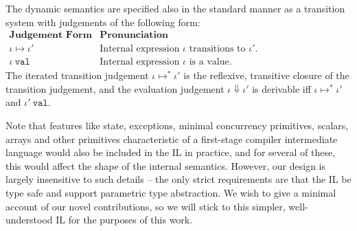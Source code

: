 \noindent
The dynamic semantics are specified also in the standard manner as a transition system with  judgements of the following form:
\\[1ex]
$
\begin{array}{ll}
\textbf{Judgement Form} & \textbf{Pronunciation}\\
\iota \mapsto \iota' & \text{Internal expression $\iota$ transitions to $\iota'$.}\\
\iota~\mathtt{val} & \text{Internal expression $\iota$ is a value.}
\end{array}
$
\\[1ex]
The iterated transition judgement $\iota \mapsto^{*} \iota'$ is the reflexive, transitive closure of the transition judgement, and the evaluation judgement $\iota \Downarrow \iota'$ is derivable iff $\iota \mapsto^{*} \iota'$ and $\iota'~\mathtt{val}$. 

Note that features like state, exceptions, minimal concurrency primitives, scalars, arrays and other primitives characteristic of a first-stage compiler intermediate language would also be included in the IL in practice, and for several of these, this would affect the shape of the internal semantics. However, our design is largely insensitive to such details -- the only strict requirements are that the IL be type safe and support parametric type abstraction. We wish to give a minimal account of our novel contributions, so we will stick to this simpler, well-understood IL for the purposes of this work. %



